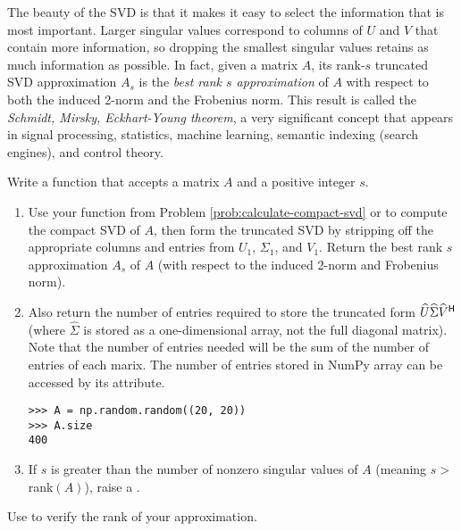 The beauty of the SVD is that it makes it easy to select the information that is most important.
Larger singular values correspond to columns of $U$ and $V$ that contain more information, so dropping the smallest singular values retains as much information as possible.
In fact, given a matrix $A$, its rank-$s$ truncated SVD approximation $A_s$ is the \emph{best rank $s$ approximation} of $A$ with respect to both the induced 2-norm and the Frobenius norm.
This result is called the \emph{Schmidt, Mirsky, Eckhart-Young theorem}, a very significant concept that appears in signal processing, statistics, machine learning, semantic indexing (search engines), and control theory.

\begin{comment}
We can also calculate $A_s$ by finding the full SVD, and setting all singular values after the $k$th to zero.
Thus the modified $\Sigma$ would be
\begin{equation*}
\Sigma_{s} = \mbox{diag}(\sigma_1,\sigma_2,\ldots,\sigma_s,0,\ldots,0).
\end{equation*}
Multiplying this matrix with the original $U$ and $V\hrm$ will give the same $A_s$ that was found by computing the truncated SVD directly.
\end{comment}

\begin{problem} %
Write a function that accepts a matrix $A$ and a positive integer $s$.
\begin{enumerate}
\item Use your function from Problem \ref{prob:calculate-compact-svd} or  to compute the compact SVD of $A$, then form the truncated SVD by stripping off the appropriate columns and entries from $U_1$, $\Sigma_1$, and $V_1$.
Return the best rank $s$ approximation $A_s$ of $A$ (with respect to the induced 2-norm and Frobenius norm).
\item Also return the number of entries required to store the truncated form $\widehat{U}\widehat{\Sigma} \widehat{V}^{\mathsf H}$ (where $\widehat{\Sigma}$ is stored as a one-dimensional array, not the full diagonal matrix). 
Note that the number of entries needed will be the sum of the number of entries of each marix.
The number of entries stored in NumPy array can be accessed by its  attribute.
\begin{lstlisting}
>>> A = np.random.random((20, 20))
>>> A.size
400
\end{lstlisting}
\item If $s$ is greater than the number of nonzero singular values of $A$ (meaning $s > $ rank$(A)$), raise a .
\end{enumerate}
Use  to verify the rank of your approximation.
\label{prob:svd_approx}
\end{problem}

